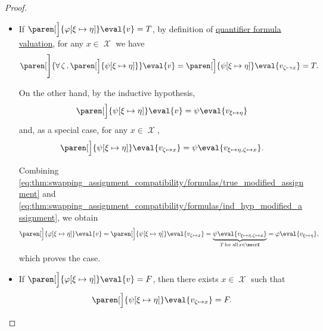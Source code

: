 \begin{proof}
\begin{itemize}
\begin{itemize}
      \begin{itemize}
        \item If \( \paren[\Big]{\varphi[\xi \mapsto \eta]}\eval{v} = T \), by definition of \hyperref[def:first_order_valuation/formula_valuation]{quantifier formula valuation}, for any \( x \in \mscrX \) we have
        \begin{equation}\label{eq:thm:swapping_assignment_compatibility/formulas/true_modified_assignment}
          \paren[\Bigg]{\qforall{\zeta} \paren[\Big]{ \psi[\xi \mapsto \eta] }}\eval{v}
          =
          \paren[\Big]{\psi[\xi \mapsto \eta]}\eval{v_{\zeta \mapsto x}}
          =
          T.
        \end{equation}

        On the other hand, by the inductive hypothesis,
        \begin{equation*}
          \paren[\Big]{ \psi[\xi \mapsto \eta] }\eval{v} = \psi\eval{v_{\xi \mapsto \eta}}
        \end{equation*}
        and, as a special case, for any \( x \in \mscrX \),
        \begin{equation}\label{eq:thm:swapping_assignment_compatibility/formulas/ind_hyp_modified_assignment}
          \paren[\Big]{ \psi[\xi \mapsto \eta] }\eval{v_{\zeta \mapsto x}} = \psi\eval{v_{\xi \mapsto \eta, \zeta \mapsto x}}.
        \end{equation}

        Combining \eqref{eq:thm:swapping_assignment_compatibility/formulas/true_modified_assignment} and \eqref{eq:thm:swapping_assignment_compatibility/formulas/ind_hyp_modified_assignment}, we obtain
        \begin{equation*}
          \paren[\Big]{ \varphi[\xi \mapsto \eta] }\eval{v}
          =
          \paren[\Big]{ \psi[\xi \mapsto \eta] }\eval{v_{\zeta \mapsto x}}
          =
          \underbrace{\psi\eval{v_{\xi \mapsto \eta, \zeta \mapsto x}}}_{T \T{for all} x \in \mscrX}
          =
          \varphi\eval{v_{\xi \mapsto \eta}},
        \end{equation*}
        which proves the case.

        \item If \( \paren[\Big]{\varphi[\xi \mapsto \eta]}\eval{v} = F \), then there exists \( x \in \mscrX \) such that
        \begin{equation*}
          \paren[\Big]{\psi[\xi \mapsto \eta]}\eval{v_{\zeta \mapsto x}} = F.
        \end{equation*}


\end{itemize}
\end{itemize}
\end{itemize}
\end{proof}
